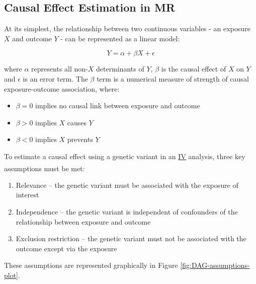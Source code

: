 \documentclass[
]{article}
\providecommand{\tightlist}{%
  \setlength{\itemsep}{0pt}\setlength{\parskip}{0pt}}
\begin{document}
\subsection{Causal Effect Estimation in MR}\label{causal-effect-estimation-in-mr}

At its simplest, the relationship between two continuous variables - an exposure \(X\) and outcome \(Y\) - can be represented as a linear model:

\begin{equation} 
Y = \alpha + \beta X + \epsilon
\end{equation}

where \(\alpha\) represents all non-\(X\) determinants of \(Y\), \(\beta\) is the causal effect of \(X\) on \(Y\) and \(\epsilon\) is an error term. The \(\beta\) term is a numerical measure of strength of causal exposure-outcome association, where:

\begin{itemize}
\tightlist
\item
  \(\beta = 0\) implies no causal link between exposure and outcome
\item
  \(\beta > 0\) implies \(X\) causes \(Y\)
\item
  \(\beta < 0\) implies \(X\) prevents \(Y\)
\end{itemize}

To estimate a causal effect using a genetic variant in an \hyperref[acronyms_IV]{IV} analysis, three key assumptions must be met\textsuperscript{}:

\begin{enumerate}
\def\labelenumi{\arabic{enumi}.}
\tightlist
\item
  Relevance -- the genetic variant must be associated with the exposure of interest
\item
  Independence -- the genetic variant is independent of confounders of the relationship between exposure and outcome
\item
  Exclusion restriction -- the genetic variant must not be associated with the outcome except via the exposure
\end{enumerate}

These assumptions are represented graphically in Figure \ref{fig:DAG-assumptions-plot}.
\end{document}
